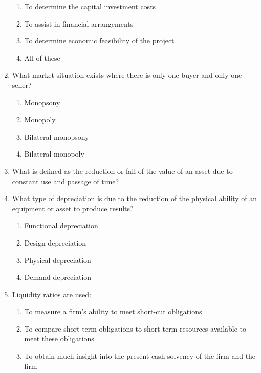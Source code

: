 \documentclass[11pt,a4paper]{article}
\begin{document}
\begin{enumerate}
\begin{enumerate}[label=\Alph*.]
\item{To determine the capital investment costs}
\item{To assist in financial arrangements}
\item{To determine economic feasibility of the project}
\item{All of these}
\end{enumerate}
\item{What market situation exists where there is only one buyer and only one seller?}
\begin{enumerate}[label=\Alph*.]
\item{Monopsony}
\item{Monopoly}
\item{Bilateral monopsony}
\item{Bilateral monopoly}
\end{enumerate}
\item{What is defined as the reduction or fall of the value of an asset due to constant use and passage of time?}
\\
\item{What type of depreciation is due to the reduction of the physical ability of an equipment or asset to produce results?}
\begin{enumerate}[label=\Alph*.]
\item{Functional depreciation}
\item{Design depreciation}
\item{Physical depreciation}
\item{Demand depreciation}
\end{enumerate}
\item{Liquidity ratios are used:}
\begin{enumerate}[label=\Alph*.]
\item{To measure a firm's ability to meet short-cut obligations}
\item{To compare short term obligations to short-term resources available to meet these obligations}
\item{To obtain much insight into the present cash solvency of the firm and the firm}

\end{enumerate}
\end{enumerate}
\end{document}
